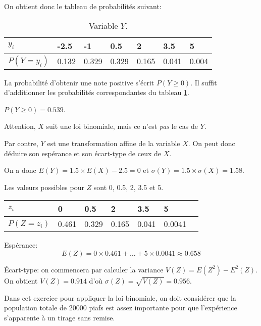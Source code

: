\documentclass[a4paper,12pt]{scrartcl}
\begin{document}
\subquestion{}
On obtient donc le tableau de probabilités suivant:

\begin{table}[h]
\centering
\begin{tabular}{|l|l|l|l|l|l|l|}
\hline
$y_i$        &-2.5   &-1     & 0.5   & 2     & 3.5   & 5     \\ \hline
$P(Y=y_i)$  & 0.132 & 0.329 & 0.329 & 0.165 & 0.041 & 0.004
 \\ \hline
\end{tabular}
 \caption{Variable $Y$.}
 \label{tab:y}
\end{table}

\subquestion{}
La probabilité d'obtenir une note positive s'écrit $P(Y \geqslant 0)$. Il suffit d'additionner les probabilités correspondantes du tableau \ref{tab:y}.

$P(Y \geqslant 0) = 0.539$.

\subquestion{}
Attention, $X$ suit une loi binomiale, mais ce n'est \emph{pas} le cas de $Y$. 

Par contre, $Y$ est une transformation affine de la variable $X$. On peut donc déduire son espérance et son écart-type de ceux de $X$.

On a donc $E(Y) = 1.5 \times E(X) - 2.5 = 0$ et $\sigma(Y) = 1.5 \times \sigma(X) = 1.58$.


\subquestion{}
Les valeurs possibles pour $Z$ sont 0, 0.5, 2, 3.5 et 5.

\subquestion{}
\begin{tabular}{|l|l|l|l|l|l|l|}
\hline
$z_i$       & 0     & 0.5   & 2     & 3.5   & 5     \\ \hline
$P(Z=z_i)$  & 0.461 & 0.329 & 0.165 & 0.041 & 0.0041
 \\ \hline
\end{tabular}

\subquestion{}
Espérance:
\begin{equation*}
 E(Z) = 0 \times 0.461 + \ldots + 5 \times 0.0041 \approx 0.658
\end{equation*}

Écart-type: on commencera par calculer la variance $V(Z) = E(Z^2) - E^2(Z)$. On obtient $V(Z) = 0.914$ d'où $\sigma(Z) = \sqrt{V(Z)} = 0.956$.


Dans cet exercice pour appliquer la loi binomiale, on doit considérer que la population totale de 20000 piafs est assez importante pour que l'expérience s'apparente à un tirage sans remise. 
\end{document}
